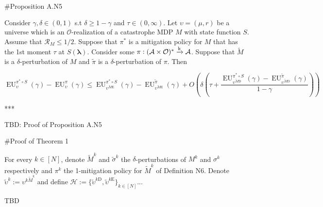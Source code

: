 \documentclass[a4paper]{article}
\newcommand{\AP}[1]{\left(#1\right)}
\newcommand{\Estr}{\boldsymbol{\lambda}}
\newcommand{\M}{\xrightarrow{\textnormal{k}}}
\newcommand{\Ob}{\mathcal{O}}
\newcommand{\A}{\mathcal{A}}
\newcommand{\R}{\mathcal{R}}
\newcommand{\FH}{(\A \times \Ob)^*}
\newcommand{\Hy}{\mathcal{H}}
\newcommand{\RMD}{\mathrm{D}}
\newcommand{\RME}{\mathrm{E}}
\newcommand{\EU}{\operatorname{EU}}
\begin{document}
\#Proposition A.N5

Consider $\gamma,\delta\in(0,1)$ s.t $\delta \geq 1 - \gamma$ and $\tau\in(0,\infty)$. Let $\upsilon=(\mu,r)$ be a universe which is an $\Ob$-realization of a catastrophe MDP $M$ with state function $S$. Assume that $\R_M \leq 1/2$. Suppose that $\pi^*$ is a mitigation policy for $M$ that has the 1st moment $\tau$ at $S(\Estr)$. Consider some $\pi: \FH \M \A$. Suppose that $\tilde{M}$ is a $\delta$-perturbation of $M$ and $\tilde{\pi}$ is a $\delta$-perturbation of $\pi$. Then

$$\EU_{\upsilon}^{\pi^* \circ S}(\gamma)-\EU_{\upsilon}^{\pi}(\gamma) \leq \EU_{\upsilon^{\tilde{M}\RME}}^{\pi^* \circ S}(\gamma)-\EU_{\upsilon^{\tilde{M}\RME}}^{\tilde{\pi}}(\gamma)   + O\AP{\delta\AP{\tau+\frac{\EU_{\upsilon^{\tilde{M}\RMD}}^{\pi^* \circ S}(\gamma)-\EU_{\upsilon^{\tilde{M}\RMD}}^{\tilde{\pi}}(\gamma)}{1-\gamma}}}$$

***

TBD: Proof of Proposition A.N5

\#Proof of Theorem 1

For every $k \in [N]$, denote $\tilde{M}^k$ and $\tilde{\sigma}^k$ the $\delta$-perturbations of $M^k$ and $\sigma^k$ respectively and $\pi^k$ the 1-mitigation policy for $\tilde{M}^k$ of Definition N6. Denote $\tilde{\upsilon}^k:=\upsilon^{k\tilde{M}^k}$ and define $\Hy:=\{\tilde{\upsilon}^{k\RMD},\tilde{\upsilon}^{k\RME}\}_{k \in [N]}$...



TBD
\end{document}
